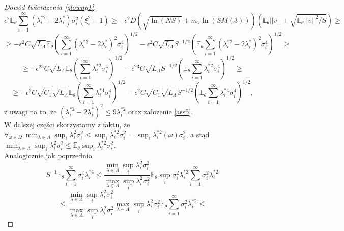 \documentclass{article}
\begin{document}
\begin{proof}[Dowód twierdzenia \ref{glowny1}]
\begin{displaymath}
\epsilon^2\mathbb{E}_{\theta}\sum_{i=1}^{\infty}(\lambda_i^{*2}-2\lambda_i^*)\sigma_i^2(\xi_i^2-1)\geq -\epsilon^2D\left(\sqrt{\ln (NS)}+m_V\ln (SM(3))\right)\left(\mathbb{E}_{\theta}||v||+\sqrt{\mathbb{E}_{\theta}||v||^2/S}\right)\geq
\end{displaymath}
\begin{displaymath}
\geq -\epsilon^2C\sqrt{L_{\Lambda}}\mathbb{E}_{\theta}\left(\sum_{i=1}^{\infty}(\lambda_i^{*2}-2\lambda_i^*)^2\sigma_i^4\right)^{1/2}-\epsilon^2C\sqrt{L_{\Lambda}}S^{-1/2}\left(\mathbb{E}_{\theta}\sum_{i=1}^{\infty}(\lambda_i^{*2}-2\lambda_i^*)^2\sigma_i^4\right)^{1/2}\geq
\end{displaymath}
\begin{displaymath}
\geq -\epsilon^23C\sqrt{L_{\Lambda}}\mathbb{E}_{\theta}\left(\sum_{i=1}^{\infty}\lambda_i^{*2}\sigma_i^4\right)^{1/2}-\epsilon^23C\sqrt{L_{\Lambda}}S^{-1/2}\left(\mathbb{E}_{\theta}\sum_{i=1}^{\infty}\lambda_i^{*2}\sigma_i^4\right)^{1/2}\geq
\end{displaymath}
\begin{displaymath}
\geq -\epsilon^2C\sqrt{C_1}\sqrt{L_{\Lambda}}\mathbb{E}_{\theta}\left(\sum_{i=1}^{\infty}\lambda_i^{*4}\sigma_i^4\right)^{1/2}-\epsilon^2C\sqrt{C_1}\sqrt{L_{\Lambda}}S^{-1/2}\left(\mathbb{E}_{\theta}\sum_{i=1}^{\infty}\lambda_i^{*4}\sigma_i^4\right)^{1/2},
\end{displaymath}
z uwagi na to, że $(\lambda_i^{*2}-2\lambda_i^*)^2\leq 9\lambda_i^{*2}$ oraz założenie \ref{ass5}.\\
W dalszej części skorzystamy z faktu, że $\forall_{\omega\in \Omega}\ \min_{\lambda\in \Lambda}\sup_i \lambda_i^2\sigma_i^2\leq \sup_i\lambda_i^{*2}\sigma_i^2=\sup_i\lambda_i^{*2}(\omega)\sigma_i^2$, a stąd $\min_{\lambda\in \Lambda}\sup_i \lambda_i^2\sigma_i^2\leq \mathbb{E}_{\theta}\sup_i\lambda_i^{*2}\sigma_i^2$.\\
Analogicznie jak poprzednio
\begin{displaymath}
S^{-1}\mathbb{E}_{\theta}\sum_{i=1}^{\infty}\sigma_i^4\lambda_i^{*4}\leq \frac{\min_{\lambda\in \Lambda}\sup_i \lambda_i^2\sigma_i^2}{\max_{\lambda\in \Lambda}\sup_i \lambda_i^2\sigma_i^2}\mathbb{E}_{\theta}\sup_i\sigma_i^2\lambda_i^{*2}\sum_{i=1}^{\infty}\sigma_i^2\lambda_i^{*2}
\end{displaymath}
\begin{displaymath}
\leq \frac{\min_{\lambda\in \Lambda}\sup_i \lambda_i^2\sigma_i^2}{\max_{\lambda\in \Lambda}\sup_i \lambda_i^2\sigma_i^2}\max_{\lambda\in \Lambda}\sup_i \lambda_i^2\sigma_i^2\mathbb{E}_{\theta}\sum_{i=1}^{\infty}\sigma_i^2\lambda_i^{*2}\leq

\end{displaymath}
\end{proof}
\end{document}
